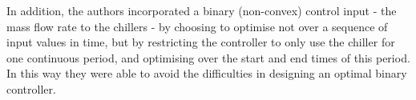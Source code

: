 In addition, the authors incorporated a binary (non-convex) control input - the mass flow rate to the chillers - by choosing to optimise not over a sequence of input values in time, but by restricting the controller to only use the chiller for one continuous period, and optimising over the start and end times of this period.
In this way they were able to avoid the difficulties in designing an optimal binary controller.

